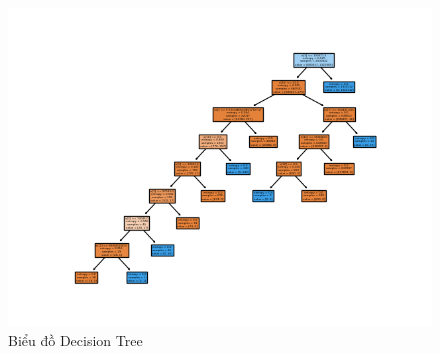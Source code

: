 \documentclass[a4paper]{article}
\begin{document}
\begin{figure}
    \centering
    \includegraphics[width=1\linewidth]{images//result/Figure_1.png}
    \caption{Biểu đồ Decision Tree}
    \label{fig:decisiontree}
\end{figure}
\end{document}

